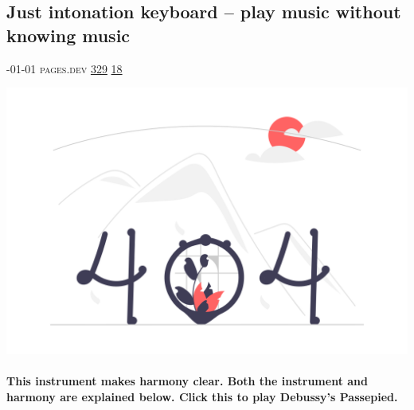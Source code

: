 \documentclass[10pt,a4paper]{article}
\begin{document}
\begin{multicols*}{2}

\noindent\begin{minipage}{\linewidth}
\subsection{Just intonation keyboard – play music without knowing music}
\textsc{\footnotesize
{\scriptsize\faCalendar}-01-01 
{\scriptsize\faGlobe}\space 
pages.dev 
{\scriptsize\faThumbsOUp}\space 
\href{http://news.ycombinator.com/item?id=37194128\&utm\_term=comment}{329} 
{\scriptsize\faComments}\space 
\href{http://news.ycombinator.com/item?id=37194128\&utm\_term=comment}{18} 
}
\par\medskip\noindent
\href{https://ad8e.pages.dev/keyboard?utm\_source=hackernewsletter\&utm\_medium=email\&utm\_term=fun}{
    \includegraphics[width=0.99\linewidth]{notfound.png}
}
\end{minipage}
\paragraph{}
\textbf{This instrument makes harmony clear. Both the instrument and harmony are explained below.
Click this to play Debussy's Passepied.}
\paragraph{}


\end{multicols*}
\end{document}
